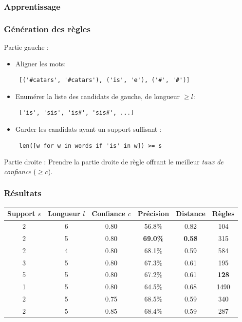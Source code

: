 \documentclass{beamer}
\begin{document}
\begin{frame}[fragile]
\frametitle{Apprentissage}
\frametitle{Génération des règles}

	\begin{block}{Partie gauche :}
	 	\begin{itemize}
	 	\item Aligner les mots:
            {\scriptsize \begin{verbatim} [('#catars', '#catars'), ('is', 'e'), ('#', '#')] \end{verbatim}}
	 	\item Enumérer la liste des candidats de gauche, de longueur $\geq l$:
            {\scriptsize \begin{verbatim} ['is', 'sis', 'is#', 'sis#', ...] \end{verbatim}}
	 	\item Garder les candidats ayant un support suffisant :
            {\scriptsize \begin{verbatim} len([w for w in words if 'is' in w]) >= s \end{verbatim}}
		\end{itemize}
	\end{block}
	
	\begin{block}{Partie droite :}
        Prendre la partie droite de règle offrant le meilleur \emph{taux de confiance} ($\geq c$).
	\end{block}		
\end{frame}

\begin{frame}
\frametitle{Résultats}
\footnotesize
\begin{center}
\begin{tabular}{|c|c|c||c|c|c|}
\hline
Support $s$&Longueur $l$&Confiance $c$&Précision&Distance&Règles\\
\hline
2&6&0.80&56.8\%&0.82&104\\
\hline
2&5&0.80&\textbf{69.0\%}&\textbf{0.58}&315\\
\hline
2&4&0.80&68.1\%&0.59&584\\
\hline
\hline
3&5&0.80&67.3\%&0.61&195\\
\hline
5&5&0.80&67.2\%&0.61&\textbf{128}\\
\hline
1&5&0.80&64.5\%&0.68&1490\\
\hline
\hline
2&5&0.75&68.5\%&0.59&340\\
\hline
2&5&0.85&68.4\%&0.59&287\\
\hline
\end{tabular}
\end{center}
\normalsize
\end{frame}
\end{document}
